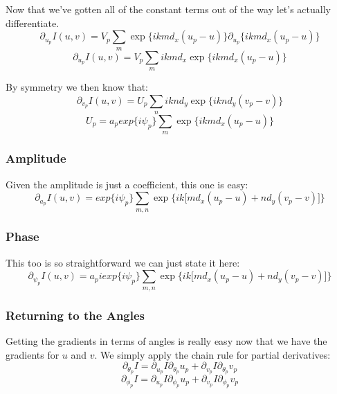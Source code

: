 \documentclass[10pt,a4paper]{article}
\begin{document}
Now that we've gotten all of the constant terms out of the way let's actually differentiate.
\begin{equation}
\partial_{u_p}I(u, v) =V_p\sum_{m}\exp\lbrace ikmd_x(u_p-u)\rbrace \partial_{u_p}\lbrace ikmd_x(u_p-u) \rbrace
\end{equation}
\begin{equation}
\partial_{u_p}I(u, v) =V_p\sum_{m}ikmd_x\exp\lbrace ikmd_x(u_p-u)\rbrace
\end{equation}

By symmetry we then know that:
\begin{equation}
\partial_{v_p}I(u, v) =U_p\sum_{n}iknd_y\exp\lbrace iknd_y(v_p-v)\rbrace
\end{equation}
\begin{equation}
U_p = a_p exp\lbrace i\psi_p \rbrace \sum_{m} \exp\lbrace ikmd_x(u_p-u)\rbrace
\end{equation}

\subsubsection{Amplitude}
Given the amplitude is just a coefficient, this one is easy:
\begin{equation}
\partial_{a_p}I(u, v) =  exp\lbrace i\psi_p \rbrace \sum_{m,n}\exp\lbrace ik \lbrack md_x(u_p-u)+nd_y(v_p-v)\rbrack\rbrace 
\end{equation}

\subsubsection{Phase}
This too is so straightforward we can just state it here:
\begin{equation}
\partial_{\psi_p}I(u, v) =  a_p iexp\lbrace i\psi_p \rbrace \sum_{m,n}\exp\lbrace ik \lbrack md_x(u_p-u)+nd_y(v_p-v)\rbrack\rbrace 
\end{equation}

\subsubsection{Returning to the Angles}
Getting the gradients in terms of angles is really easy now that we have the gradients for $u$ and $v$. We simply apply the chain rule for partial derivatives:
\begin{equation}
\partial_{\theta_p}I = \partial_{u_p}I \partial_{\theta_p}u_p + \partial_{v_p}I \partial_{\theta_p}v_p
\end{equation}
\begin{equation}
\partial_{\phi_p}I = \partial_{u_p}I \partial_{\phi_p}u_p + \partial_{v_p}I \partial_{\phi_p}v_p
\end{equation}
\end{document}
